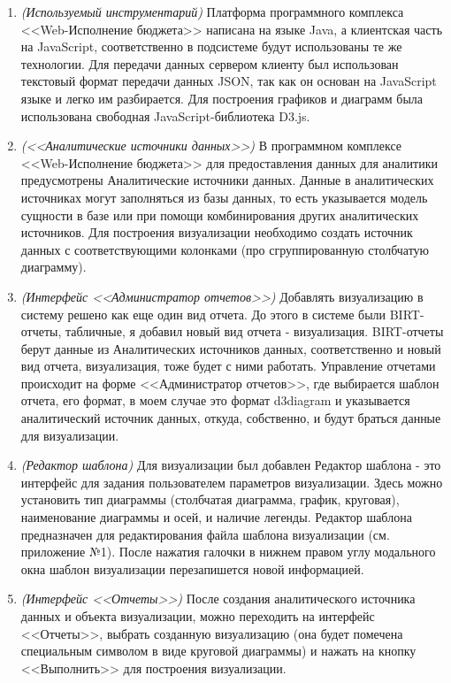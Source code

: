 \documentclass[a4paper]{extarticle}
\begin{document}
\begin{enumerate}[label=\textbf{\arabic*})]
\begin{itemize}
        \end{itemize}
    \item \textit{(Используемый инструментарий)} Платформа программного комплекса <<Web-Исполнение бюджета>> написана на языке Java, а клиентская часть на JavaScript, соответственно в подсистеме будут использованы те же технологии. Для передачи данных сервером клиенту был использован текстовый формат передачи данных JSON, так как он основан на JavaScript языке и легко им разбирается. Для построения графиков и диаграмм была использована свободная JavaScript-библиотека D3.js.
    \item \textit{(<<Аналитические источники данных>>)} В программном комплексе <<Web-\-Исполнение бюджета>> для предоставления данных для аналитики предусмотрены Аналитические источники данных. Данные в аналитических источниках могут заполняться из базы данных, то есть указывается модель сущности в базе или при помощи комбинирования других аналитических источников. Для построения визуализации необходимо создать источник данных с соответствующими колонками (про сгруппированную столбчатую диаграмму).
    \item \textit{(Интерфейс <<Администратор отчетов>>)} Добавлять визуализацию в систему решено как еще один вид отчета. До этого в системе были BIRT-отчеты, табличные, я добавил новый вид отчета - визуализация. BIRT-отчеты берут данные из Аналитических источников данных, соответственно и новый вид отчета, визуализация, тоже будет с ними работать. Управление отчетами происходит на форме <<Администратор отчетов>>, где выбирается шаблон отчета, его формат, в моем случае это формат d3diagram и указывается аналитический источник данных, откуда, собственно, и будут браться данные для визуализации.
	\item \textit{(Редактор шаблона)} Для визуализации был добавлен Редактор шаблона - это интерфейс для задания пользователем параметров визуализации. Здесь можно установить тип диаграммы (столбчатая диаграмма, график, круговая), наименование диаграммы и осей, и наличие легенды. Редактор шаблона предназначен для редактирования файла шаблона визуализации (см. приложение №1). После нажатия галочки в нижнем правом углу модального окна шаблон визуализации перезапишется новой информацией.
	\item \textit{(Интерфейс <<Отчеты>>)} После создания аналитического источника данных и объекта визуализации, можно переходить на интерфейс <<Отчеты>>, выбрать созданную визуализацию (она будет помечена специальным символом в виде круговой диаграммы) и нажать на кнопку <<Выполнить>> для построения визуализации.

\end{enumerate}
\end{document}
